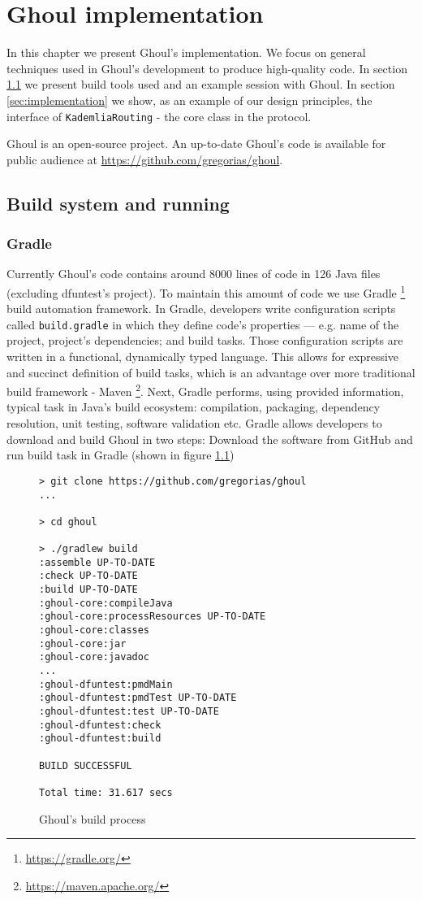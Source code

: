\chapter{Ghoul implementation}
\label{ch:implementation}
In this chapter we present Ghoul's implementation.
We focus on general techniques used in Ghoul's development to produce high-quality code.
In section \ref{sec:build} we present build tools used and an example session with Ghoul.
In section \ref{sec:implementation} we show, as an example of our design principles, the interface of \texttt{KademliaRouting} - the core class in the protocol.

Ghoul is an open-source project.
An up-to-date Ghoul's code is available for public audience at \url{https://github.com/gregorias/ghoul}.

\section{Build system and running}
\label{sec:build}

\subsection{Gradle}
Currently Ghoul's code contains around 8000 lines of code in 126 Java files (excluding dfuntest's project).
To maintain this amount of code we use Gradle \footnote{\url{https://gradle.org/}} build automation framework.
In Gradle, developers write configuration scripts called \texttt{build.gradle} in which they define code's properties --- e.g. name of the project, project's dependencies; and build tasks.
Those configuration scripts are written in a functional, dynamically typed language.
This allows for expressive and succinct definition of build tasks, which is an
advantage over more traditional build framework - Maven \footnote{\url{https://maven.apache.org/}}.
Next, Gradle performs, using provided information, typical task in Java's build ecosystem: compilation, packaging, dependency resolution, unit testing, software validation etc.
Gradle allows developers to download and build Ghoul in two steps: Download the software from GitHub and run build task in Gradle (shown in figure \ref{fig:ghoul_build_process})

\begin{figure}[tb]
\begin{verbatim}
> git clone https://github.com/gregorias/ghoul
...

> cd ghoul

> ./gradlew build
:assemble UP-TO-DATE
:check UP-TO-DATE
:build UP-TO-DATE
:ghoul-core:compileJava
:ghoul-core:processResources UP-TO-DATE
:ghoul-core:classes
:ghoul-core:jar
:ghoul-core:javadoc
...
:ghoul-dfuntest:pmdMain
:ghoul-dfuntest:pmdTest UP-TO-DATE
:ghoul-dfuntest:test UP-TO-DATE
:ghoul-dfuntest:check
:ghoul-dfuntest:build

BUILD SUCCESSFUL

Total time: 31.617 secs
\end{verbatim}
\caption{Ghoul's build process}
\label{fig:ghoul_build_process}
\end{figure}

